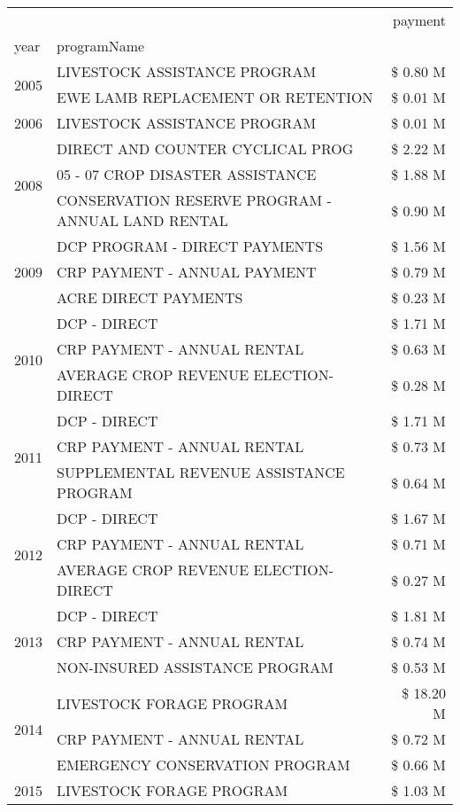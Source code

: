 \begin{tabular}{llr}
\toprule
 &  & payment \\
year & programName &  \\
\midrule
\multirow[t]{2}{*}{2005} & LIVESTOCK ASSISTANCE PROGRAM & \$ 0.80 M \\
 & EWE LAMB REPLACEMENT OR RETENTION & \$ 0.01 M \\
\cline{1-3}
2006 & LIVESTOCK ASSISTANCE PROGRAM & \$ 0.01 M \\
\cline{1-3}
\multirow[t]{3}{*}{2008} & DIRECT AND COUNTER CYCLICAL PROG & \$ 2.22 M \\
 & 05 - 07 CROP DISASTER ASSISTANCE & \$ 1.88 M \\
 & CONSERVATION RESERVE PROGRAM - ANNUAL LAND RENTAL & \$ 0.90 M \\
\cline{1-3}
\multirow[t]{3}{*}{2009} & DCP PROGRAM - DIRECT PAYMENTS & \$ 1.56 M \\
 & CRP PAYMENT - ANNUAL PAYMENT & \$ 0.79 M \\
 & ACRE DIRECT PAYMENTS & \$ 0.23 M \\
\cline{1-3}
\multirow[t]{3}{*}{2010} & DCP - DIRECT & \$ 1.71 M \\
 & CRP PAYMENT - ANNUAL RENTAL & \$ 0.63 M \\
 & AVERAGE CROP REVENUE ELECTION-DIRECT & \$ 0.28 M \\
\cline{1-3}
\multirow[t]{3}{*}{2011} & DCP - DIRECT & \$ 1.71 M \\
 & CRP PAYMENT - ANNUAL RENTAL & \$ 0.73 M \\
 & SUPPLEMENTAL REVENUE ASSISTANCE PROGRAM & \$ 0.64 M \\
\cline{1-3}
\multirow[t]{3}{*}{2012} & DCP - DIRECT & \$ 1.67 M \\
 & CRP PAYMENT - ANNUAL RENTAL & \$ 0.71 M \\
 & AVERAGE CROP REVENUE ELECTION-DIRECT & \$ 0.27 M \\
\cline{1-3}
\multirow[t]{3}{*}{2013} & DCP - DIRECT & \$ 1.81 M \\
 & CRP PAYMENT - ANNUAL RENTAL & \$ 0.74 M \\
 & NON-INSURED ASSISTANCE PROGRAM & \$ 0.53 M \\
\cline{1-3}
\multirow[t]{3}{*}{2014} & LIVESTOCK FORAGE PROGRAM & \$ 18.20 M \\
 & CRP PAYMENT - ANNUAL RENTAL & \$ 0.72 M \\
 & EMERGENCY CONSERVATION PROGRAM & \$ 0.66 M \\
\cline{1-3}
\multirow[t]{3}{*}{2015} & LIVESTOCK FORAGE PROGRAM & \$ 1.03 M \\

\end{tabular}
